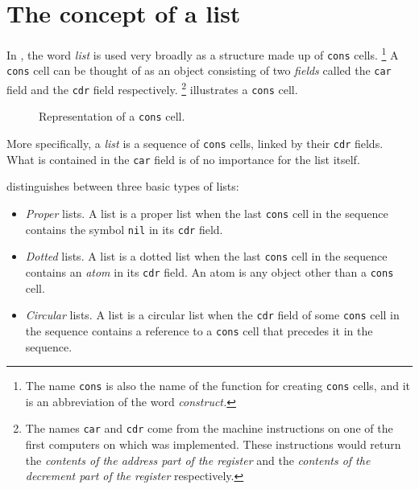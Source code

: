 \chapter{The concept of a list}
\label{chap-list-concept}

In \cl{}, the word \emph{list} is used very broadly as a structure
made up of \texttt{cons} cells.%
\footnote{The name \texttt{cons} is also the name of the function for
  creating \texttt{cons} cells, and it is an abbreviation of the word
  \emph{construct.}}  A \texttt{cons} cell can be thought of as an
object consisting of two \emph{fields} called the \texttt{car} field
and the \texttt{cdr} field respectively.%
\footnote{The names \texttt{car} and \texttt{cdr} come from the
  machine instructions on one of the first computers on which \lisp{}
  was implemented.  These instructions would return the \emph{contents
    of the address part of the register} and the \emph{contents of the
    decrement part of the register} respectively.}
 illustrates a \texttt{cons} cell.

\begin{figure}
\begin{center}
\end{center}
\caption{\label{fig-cons-cell}
Representation of a \texttt{cons} cell.}
\end{figure}

More specifically, a \emph{list} is a sequence of \texttt{cons} cells,
linked by their \texttt{cdr} fields.  What is contained in the
\texttt{car} field is of no importance for the list itself.

\cl{} distinguishes between three basic types of lists:

\begin{itemize}
\item \emph{Proper} lists.  A list is a proper list when the last
  \texttt{cons} cell in the sequence contains the symbol \texttt{nil}
  in its \texttt{cdr} field. 
\item \emph{Dotted} lists.  A list is a dotted list when the last
  \texttt{cons} cell in the sequence contains an \emph{atom}
  in its \texttt{cdr} field.  An atom is any \cl{} object other than a
  \texttt{cons} cell.
\item \emph{Circular} lists.  A list is a circular list when the
  \texttt{cdr} field of some \texttt{cons} cell in the sequence
  contains a reference to a \texttt{cons} cell that precedes it in the
  sequence. 
\end{itemize}
